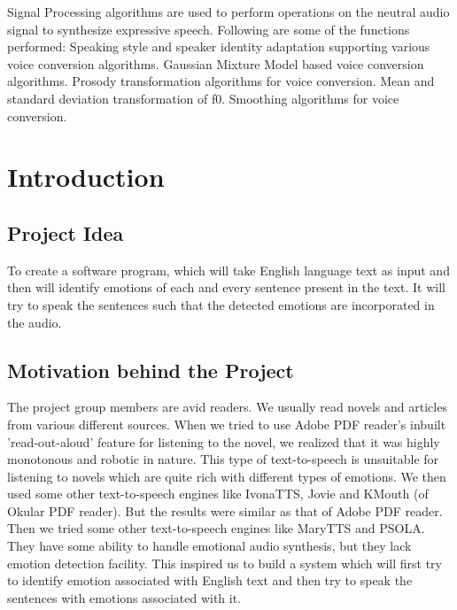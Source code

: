 \documentclass[oneside,a4paper,12pt]{book}
\begin{document}
\begin{enumerate}
\begin{enumerate}
\begin{enumerate}
\begin{enumerate}
						Signal Processing algorithms are used to perform operations on the neutral audio signal to synthesize expressive speech.
						Following are some of the functions performed:
						Speaking style and speaker identity adaptation supporting various voice conversion algorithms.
						Gaussian Mixture Model based voice conversion algorithms.
						Prosody transformation algorithms for voice conversion.
						Mean and standard deviation transformation of f0.
						Smoothing algorithms for voice conversion.
			\end{enumerate}
		\end{enumerate}
	\end{enumerate}		 
\end{enumerate} 

			
\chapter{Introduction}
\section{Project Idea}
To create a software program, which will take English language text as input and then will identify emotions of each and every sentence present in the text. It will try to speak the sentences such that the detected emotions are incorporated in the audio.


\section{Motivation behind the Project}  
The project group members are avid readers. We usually read novels and articles from various different sources. When we tried to use Adobe PDF reader's inbuilt 'read-out-aloud' feature for listening to the novel, we realized that it was highly monotonous and robotic in nature. This type of text-to-speech is unsuitable for listening to novels which are quite rich with different types of emotions. We then used some other text-to-speech engines like IvonaTTS, Jovie and KMouth (of Okular PDF reader). But the results were similar as that of Adobe PDF reader. Then we tried some other text-to-speech engines like MaryTTS and PSOLA. They have some ability to handle emotional audio synthesis, but they lack emotion detection facility. This inspired us to build a system which will first try to identify emotion associated with English text and then try to speak the sentences with emotions associated with it.
\end{document}
